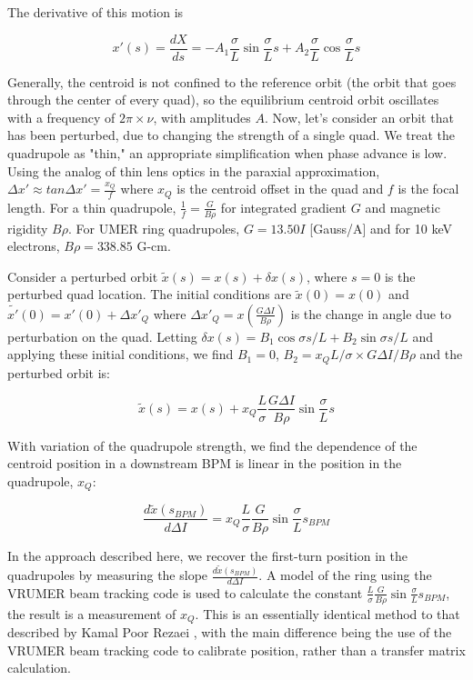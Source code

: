 The derivative of this motion is

\begin{equation} x'(s) = \frac{dX}{ds} = -A_1\frac{\sigma}{L}\sin{\frac{\sigma}{L}s} + A_2\frac{\sigma}{L}\cos{\frac{\sigma}{L}s}\end{equation}

Generally, the centroid is not confined to the reference orbit (the orbit that goes through the center of every quad), so the equilibrium centroid orbit oscillates with a frequency of $2\pi \times \nu$, with amplitudes $A$. Now, let's consider an orbit that has been perturbed, due to changing the strength of a single quad. We treat the quadrupole as "thin," an appropriate simplification when phase advance is low. Using the analog of thin lens optics in the paraxial approximation, $\Delta x' \approx tan \Delta x' = \frac{x_Q}{f}$ where $x_Q$ is the centroid offset in the quad and $f$ is the focal length. For a thin quadrupole, $\frac{1}{f} = \frac{G}{B\rho}$ for integrated gradient $G$ and magnetic rigidity $B\rho$. For UMER ring quadrupoles, $G=13.50I$ [Gauss/A] and for 10 keV electrons, $B\rho = 338.85$ G-cm. 

Consider a perturbed orbit $\tilde{x}(s) = x(s) + \delta x(s)$, where $s=0$ is the perturbed quad location. The initial conditions are $\tilde{x}(0) = x(0)$ and $\tilde{x'}(0) = x'(0) + \Delta x'_Q$ where $\Delta x'_Q = x(\frac{G \Delta I}{B\rho})$ is the change in angle due to perturbation on the quad. Letting $\delta x(s) = B_1\cos{\sigma s / L} + B_2\sin{\sigma s / L}$ and applying these initial conditions, we find $B_1 = 0$, $B_2 = x_Q L/\sigma \times G \Delta I / B\rho$ and the perturbed orbit is:

\begin{equation} \tilde{x}(s) = x(s) + x_Q \frac{L}{\sigma} \frac{G \Delta I}{B\rho} \sin{\frac{\sigma}{L}s} \end{equation}

With variation of the quadrupole strength, we find the dependence of the centroid position in a downstream BPM is linear in the position in the quadrupole, $x_Q$: 

\begin{equation} \frac{d \tilde{x}(s_{BPM})}{d\Delta I} = x_Q \frac{L}{\sigma} \frac{G}{B\rho} \sin{\frac{\sigma}{L}s_{BPM}} \label{eq:quad-response} \end{equation}

In the approach described here, we recover the first-turn position in the quadrupoles by measuring the slope $\frac{d \tilde{x}(s_{BPM})}{d\Delta I}$. A model of the ring using the VRUMER beam tracking code is used to calculate the constant $\frac{L}{\sigma} \frac{G}{B\rho} \sin{\frac{\sigma}{L}s_{BPM}}$, the result is a measurement of $x_Q$.
This is an essentially identical method to that described by Kamal Poor Rezaei \cite{KPRnote:2012}, 
with the main difference being the use of the VRUMER beam tracking code to calibrate position, rather than a transfer matrix calculation.  

